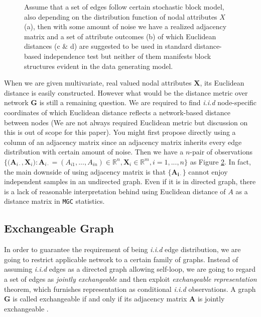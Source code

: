 \documentclass[12pt]{article}
\theoremstyle{definition}
\begin{document}
\begin{figure}[H]
\begin{subfigure}[b]{0.23\textwidth}
				\caption{}
			\label{fig:d}
		\end{subfigure}
	\caption{Assume that a set of edges follow certain stochastic block model, also depending on the distribution function of nodal attributes $X$ (a), then with some amount of noise we have a realized adjacency matrix and a set of attribute outcomes (b) of which Euclidean distances (c $\&$ d) are suggested to be used in standard distance-based independence test but neither of them manifests block structures evident in the data generating model.}
	\label{fig:matrics}
\end{figure}


When we are given multivariate, real valued nodal attributes $\mathbf{X}$, its Euclidean distance is easily constructed. However what would be the distance metric over network $\mathbf{G}$ is still a remaining question. We are required to find \textit{i.i.d} node-specific coordinates of which Euclidean distance reflects a network-based distance between nodes (We are not always required Euclidean metric \citep{lyons2013distance} but discussion on this is out of scope for this paper). You might first propose directly using a column of an adjacency matrix since an adjacency matrix inherits every edge distribution with certain amount of noise. Then we have a $n$-pair of observations $\big\{ \big( \mathbf{A}_{i \cdot} , \mathbf{X}_{i} \big) : \mathbf{A}_{i \cdot} = (A_{i 1} , ... , A_{i n} ) \in \mathbb{R}^{n}, \mathbf{X}_{i} \in \mathbb{R}^{m}, i=1,...,n  \big\}$ as Figure \ref{fig:matrics}. In fact, the main downside of using adjacency matrix is that $\{ \mathbf{A_{i \cdot}}  \}$ cannot enjoy independent samples in an undirected graph. Even if it is in directed graph, there is a lack of reasonable interpretation behind using Euclidean distance of $A$ as a distance matrix in \texttt{MGC} statistics. 
	
\subsection{Exchangeable Graph}

In order to guarantee the requirement of being \textit{i.i.d} edge distribution, we are going to restrict applicable network to a certain family of graphs. Instead of assuming \textit{i.i.d} edges as a directed graph allowing self-loop, we are going to regard a set of edges as \textit{jointly exchangeable} and then exploit \textit{exchangeable representation} theorem, which furnishes representation as conditional \textit{i.i.d} observations. A graph $\mathbf{G}$ is called exchangeable if and only if its adjacency matrix $\mathbf{A}$ is jointly exchangeable \citep{orbanz2015bayesian}. 
	
\end{document}
